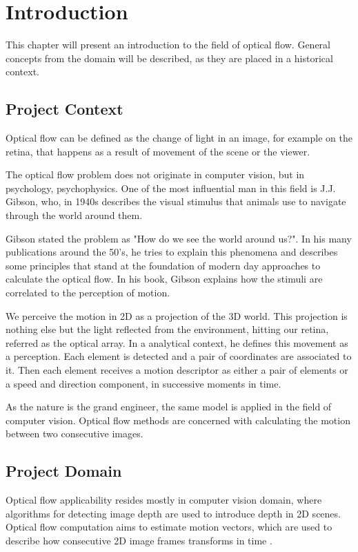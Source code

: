 \documentclass[12pt,a4paper,twoside]{report}
\begin{document}
\newpage

\tableofcontents
\newpage



\chapter{Introduction}
\pagestyle{headings}

This chapter will present an introduction to the field of optical flow. General concepts from the domain will be described, as they are placed in a historical context.

\section{Project Context}

Optical flow can be defined as the change of light in an image, for example on the retina, that happens as a result of movement of the scene or the viewer.


The optical flow problem does not originate in computer vision, but in psychology, psychophysics. One of the most influential man in this field is J.J. Gibson, who, in 1940s describes the visual stimulus that animals use to navigate through the world around them. 

Gibson stated the problem as "How do we see the world around us?". In his many publications around the 50's, he tries to explain this phenomena and describes some principles that stand at the foundation of modern day approaches to calculate the optical flow. In his book\cite{gibson1950perception}, Gibson explains how the stimuli are correlated to the perception of motion. 

We perceive the motion in 2D as a projection of the 3D world. This projection is nothing else but the light reflected from the environment, hitting our retina, referred as the optical array. In a analytical context, he defines this movement as a perception. Each element is detected and a pair of coordinates are associated to it. Then each element receives a motion descriptor as either a pair of elements or a speed and direction component, in successive moments in time. 

As the nature is the grand engineer, the same model is applied in the field of computer vision. Optical flow methods are concerned with calculating the motion between two consecutive images. 

\section{Project Domain}
Optical flow applicability resides mostly in computer vision domain, where algorithms for detecting image depth are used to introduce depth in 2D scenes. Optical flow computation  aims to estimate motion vectors, which are used to describe how consecutive 2D image frames transforms in time . 
\end{document}
